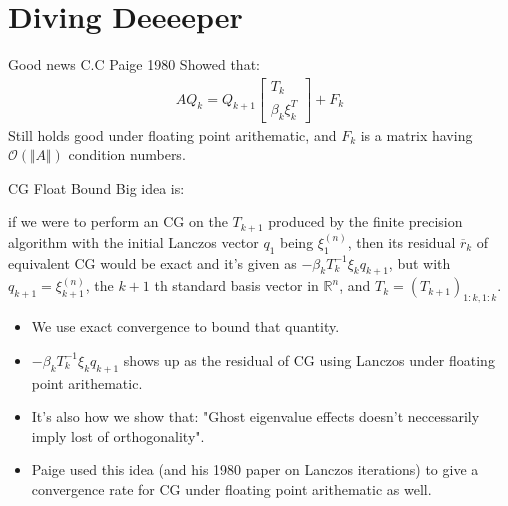 \documentclass{beamer}
\begin{document}
\section{Diving Deeeeper}
    \begin{frame}{Good news}
        C.C Paige 1980\cite{paper:paige1980} Showed that: 
        \begin{align}
            AQ_k = Q_{k + 1} 
            \begin{bmatrix}
                    T_k
                    \\
                    \beta_k \xi_k^T
            \end{bmatrix} + F_k
        \end{align}
        Still holds good under floating point arithematic, and $F_k$ is a matrix having $\mathcal O(\Vert A \Vert)$ condition numbers. 
    \end{frame}
    \begin{frame}{CG Float Bound}
        Big idea is: 
        \par
        if we were to perform an CG on the $T_{k + 1}$ produced by the finite precision algorithm with the initial Lanczos vector $q_1$ being $\xi_1^{(n)}$, then its residual $\overline{r}_{k}$ of equivalent CG would be exact and it's given as $-\beta_kT_{k}^{-1}\xi_kq_{k + 1}$, but with $q_{k + 1} = \xi_{k + 1}^{(n)}$, the $k + 1$ th standard basis vector in $\mathbb R^{n}$, and $T_k = (T_{k + 1})_{1:k, 1:k}$. 
        \begin{itemize}
            \item We use exact convergence to bound that quantity. 
            \item $-\beta_kT_{k}^{-1}\xi_kq_{k + 1}$ shows up as the residual of CG using Lanczos under floating point arithematic.
            \item It's also how we show that: "Ghost eigenvalue effects doesn't neccessarily imply lost of orthogonality". 
            \item Paige used this idea (and his 1980 paper on Lanczos iterations) to give a convergence rate for CG under floating point arithematic as well. 
        \end{itemize}
    \end{frame}
\end{document}
